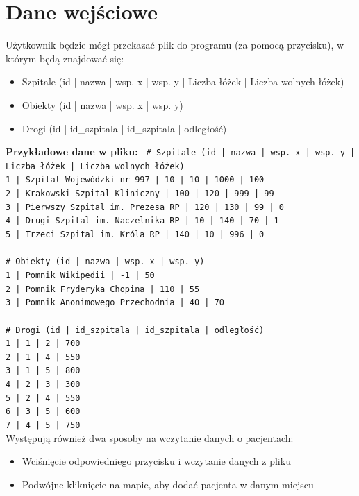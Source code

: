 \documentclass{article}
\begin{document}
\section{Dane wejściowe}
{\fontsize{14}{14}\selectfont 
Użytkownik będzie mógł przekazać plik do programu (za pomocą przycisku), w którym będą znajdować się:
\begin{itemize}
    \item Szpitale (id | nazwa | wsp. x | wsp. y | Liczba łóżek | Liczba wolnych łóżek)
    \item Obiekty (id | nazwa | wsp. x | wsp. y)
    \item Drogi (id | id\_szpitala | id\_szpitala | odległość)
\end{itemize}
\pagebreak
\textbf{Przykładowe dane w pliku:}
\newline
\newline
{\fontsize{10}{10}\selectfont 
\texttt{
\# Szpitale (id | nazwa | wsp. x | wsp. y | Liczba łóżek | Liczba wolnych łóżek)\\
1 | Szpital Wojewódzki nr 997 | 10 | 10 | 1000 | 100 \\
2 | Krakowski Szpital Kliniczny | 100 | 120 | 999 | 99\\
3 | Pierwszy Szpital im. Prezesa RP | 120 | 130 | 99 | 0\\
4 | Drugi Szpital im. Naczelnika RP | 10 | 140 | 70 | 1\\
5 | Trzeci Szpital im. Króla RP | 140 | 10 | 996 | 0\\
\\
\# Obiekty (id | nazwa | wsp. x | wsp. y)\\
1 | Pomnik Wikipedii | -1 | 50\\
2 | Pomnik Fryderyka Chopina | 110 | 55\\
3 | Pomnik Anonimowego Przechodnia | 40 | 70\\
\\
\# Drogi (id | id\_szpitala | id\_szpitala | odległość) \\
1 | 1 | 2 | 700\\
2 | 1 | 4 | 550\\
3 | 1 | 5 | 800\\
4 | 2 | 3 | 300\\
5 | 2 | 4 | 550\\
6 | 3 | 5 | 600\\
7 | 4 | 5 | 750\\
}
}
\newline
Występują również dwa sposoby na wczytanie danych o pacjentach:
\begin{itemize}
    \item Wciśnięcie odpowiedniego przycisku i wczytanie danych z pliku
    \item Podwójne kliknięcie na mapie, aby dodać pacjenta w danym miejscu
    \newline
    \newline
\end{itemize}

}
\end{document}
